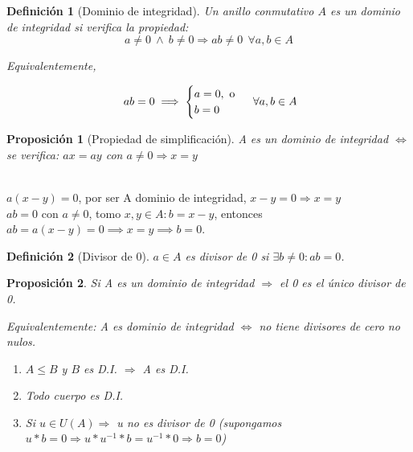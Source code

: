 \documentclass[11pt, a4paper, titlepage]{article}
\makeatletter
\newif\IfInSansMode
\let\oldsf\sffamily
\renewcommand*{\sffamily}{\oldsf\mathversion{sans}\InSansModetrue}
\let\oldnorm\normalfont
\renewcommand*{\normalfont}{\oldnorm\InSansModefalse\mathversion{normal}}
\renewenvironment{proof}[1][\proofname] {\vspace{-15pt}\par\pushQED{\qed}\normalfont\topsep6\p@\@plus6\p@\relax\trivlist\item[\hskip\labelsep\it#1\@addpunct{.}]\ignorespaces}{\popQED\endtrivlist\@endpefalse}
\renewenvironment{proof}[1][\proofname] {\par\pushQED{\qed}\normalfont\topsep6\p@\@plus6\p@\relax\trivlist\item[\hskip\labelsep\itshape\sffamily#1\@addpunct{.}]\ignorespaces}{\popQED\endtrivlist\@endpefalse}
\theoremstyle{theorem-style}
\newtheorem{nprop}{Proposición}[section]
\theoremstyle{definition-style}
\newtheorem{ndef}{Definición}[section]
\theoremstyle{remark-style}
\theoremstyle{example-style}
\newenvironment{nlist}
{\begin{enumerate}
\renewcommand\labelenumi{(\emph{\roman{enumi})}}}
{\end{enumerate}}
\makeatother
\begin{document}
\begin{ndef}[Dominio de integridad]
Un anillo conmutativo $A$ es un dominio de integridad si verifica la propiedad:
\[
a \neq 0\ \wedge\ b \neq 0 \Rightarrow ab \neq 0 \ \ \forall a,b \in A
\]

Equivalentemente,

\[ \hspace{0.1cm} ab=0 \implies \begin{cases}
	a = 0,\text{ o}\\
	b = 0
\end{cases} \ \forall a,b \in A
\]

\end{ndef}

\begin{nprop}[Propiedad de simplificación]

A es un dominio de integridad $\iff$ se verifica: $ax=ay$ con $a\neq 0 \Rightarrow x = y$
\end{nprop}
\begin{proof}\hfill\\
	\boxed{\Rightarrow} $a(x-y) = 0$, por ser A dominio de integridad, $x-y = 0 \Rightarrow x=y$ \\
	\boxed{\Leftarrow} $ab = 0$ con $a\neq 0$, tomo $x,y \in A : b = x-y$, entonces $ab = a(x-y) = 0 \implies x=y \implies b = 0$.
\end{proof}

\begin{ndef}[Divisor de 0]
	$a\in A$ es divisor de 0 si $\exists b\neq 0 : ab = 0$.
\end{ndef}

\begin{nprop}
	Si A es un dominio de integridad $\Rightarrow$ el 0 es el único divisor de 0.

	Equivalentemente: A es dominio de integridad $\iff$ no tiene divisores de cero no nulos.
\begin{nlist}
	\item $A\leq B$ y $B$ es D.I. $\Rightarrow$ A es D.I.
	\item Todo cuerpo es D.I.
	\item Si $u \in U(A) \Rightarrow$ u no es divisor de 0 (supongamos $u*b = 0 \Rightarrow u*u^{-1}*b = u^{-1}*0 \Rightarrow b=0$)
\end{nlist}
\end{nprop}
\end{document}
